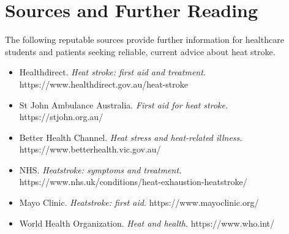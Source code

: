 \section*{Sources and Further Reading}
The following reputable sources provide further information for healthcare students and patients seeking reliable, current advice about heat stroke.

\begin{itemize}
    \item Healthdirect. \textit{Heat stroke: first aid and treatment.} https://www.healthdirect.gov.au/heat-stroke
    \item St John Ambulance Australia. \textit{First aid for heat stroke.} https://stjohn.org.au/
    \item Better Health Channel. \textit{Heat stress and heat-related illness.} https://www.betterhealth.vic.gov.au/
    \item NHS. \textit{Heatstroke: symptoms and treatment.} https://www.nhs.uk/conditions/heat-exhaustion-heatstroke/
    \item Mayo Clinic. \textit{Heatstroke: first aid.} https://www.mayoclinic.org/
    \item World Health Organization. \textit{Heat and health.} https://www.who.int/
\end{itemize}
